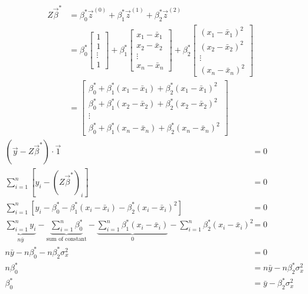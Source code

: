 \documentclass[11pt]{article}
\begin{document}
\begin{prob}
\begin{subprob}
\begin{solution}
\begin{align*}
Z\vec \beta^* &= \beta_0^*\vec z^{(0)} + \beta_1^*\vec z^{(1)} + \beta_2^*\vec z^{(2)}
\\ &= \beta_0^*\begin{bmatrix} 1 \\ 1 \\ \vdots \\ 1  \end{bmatrix} +  \beta_1^*\begin{bmatrix} x_1 - \bar x_1 \\ x_2 - \bar x_2 \\ \vdots \\ x_n - \bar x_n\end{bmatrix} + \beta_2^*\begin{bmatrix} (x_1 - \bar x_1)^2 \\ (x_2 - \bar x_2)^2 \\ \vdots \\ (x_n - \bar x_n)^2\end{bmatrix}
\\ &= \begin{bmatrix} \beta_0^* + \beta_1^*(x_1 - \bar x_1) + \beta_2^*(x_1 - \bar x_1)^2 \\ \beta_0^* + \beta_1^*(x_2 - \bar x_2)+ \beta_2^*(x_2 - \bar x_2)^2\\ \vdots \\ \beta_0^* + \beta_1^*(x_n - \bar x_n) + \beta_2^*(x_n - \bar x_n)^2\end{bmatrix}
\end{align*}
\begin{align*}
(\vec y - Z\vec \beta^*) \cdot \vec 1 &= 0
\\ \sum_{i=1}^{n}\left[y_i - (Z\vec \beta^*)_i\right] &= 0
\\ \sum_{i=1}^{n}\left[y_i - \beta_0^* - \beta_1^*(x_i - \bar x_i) - \beta_2^*(x_i - \bar x_i)^2\right] &= 0
\\ \underbrace{\sum_{i=1}^{n}y_i}_{n \bar{y}} - \underbrace{\sum_{i=1}^{n}\beta_0^*}_{\text{sum of constant}} - \underbrace{\sum_{i=1}^{n}\beta_1^*(x_i - \bar x_i)}_{0} - \sum_{i=1}^{n}\beta_2^*(x_i - \bar x_i)^2 &= 0
\\ n\bar y - n\beta_0^* - n\beta_2^*\sigma_x^2 &= 0
\\ n\beta_0^* &= n\bar y - n\beta_2^*\sigma_x^2
\\ \beta_0^* &= \boxed{\bar y - \beta_2^*\sigma_x^2}
\end{align*}
\end{solution}
\end{subprob}

\end{prob}
\end{document}
